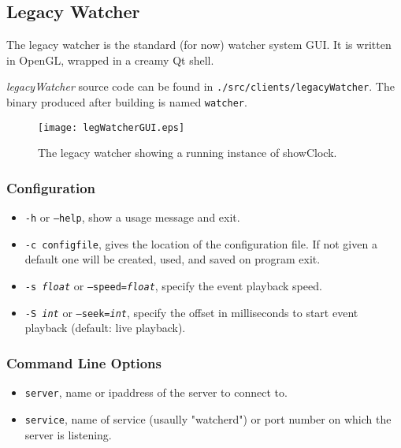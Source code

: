 \subsection{Legacy Watcher}

The legacy watcher is the standard (for now) watcher system GUI. It is written in OpenGL, wrapped in a creamy Qt shell. 

{\it legacyWatcher} source code can be found in {\tt .\slash src\slash clients\slash legacyWatcher}. The binary produced after building is 
named {\tt watcher}. 

\label{LegacyWatcher}
\begin{figure}[ht]
\centering
\texttt{[image: legWatcherGUI.eps]}
\caption{The legacy watcher showing a running instance of showClock.}
\label{fig:LegacyWatcherClock}
\end{figure}

\subsubsection{Configuration}

\begin{itemize}
\item {\tt -h} or {\tt --help}, show a usage message and exit. 
\item {\tt -c configfile}, gives the location of the configuration file. If not given a default one will be created, used, and saved on program exit.
\item {\tt -s {\it float}} or {\tt --speed={\it float}}, specify the event playback speed.
\item {\tt -S {\it int}} or {\tt --seek={\it int}}, specify the offset in milliseconds to start event playback (default: live playback).
\end{itemize}

\subsubsection{Command Line Options}

\begin{itemize}
\item {\tt server}, name or ipaddress of the server to connect to.
\item {\tt service}, name of service (usaully "watcherd") or port number on which the server is listening.
\end{itemize}
